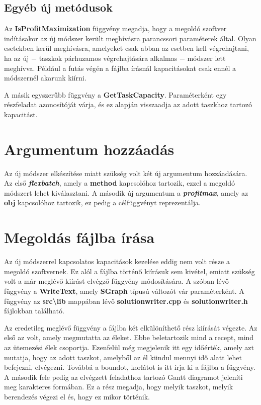 \subsection{Egyéb új metódusok}
Az \textbf{IsProfitMaximization} függvény megadja, hogy a megoldó szoftver indításakor az új módszer került meghívásra parancssori paraméterek által. Olyan esetekben kerül meghívásra, amelyeket csak abban az esetben kell végrehajtani, ha az új $-$ taszkok párhuzamos végrehajtására alkalmas $-$ módszer lett meghívva. Például a futás végén a fájlba írásnál kapacitásokat csak ennél a módszernél akarunk kiírni.

A másik egyszerűbb függvény a \textbf{GetTaskCapacity}. Paraméterként egy részfeladat azonosítóját várja, és ez alapján visszaadja az adott taszkhoz tartozó kapacitást.

\section{Argumentum hozzáadás}
Az új módszer elkészítése miatt szükség volt két új argumentum hozzáadására.
Az első \textbf{\textit{flexbatch}}, amely a \textbf{method} kapcsolóhoz tartozik, ezzel a megoldó módszert lehet kiválasztani.
A második új argumentum a \textbf{\textit{profit\textunderscore max}}, amely az \textbf{obj} kapcsolóhoz tartozik, ez pedig a célfüggvényt reprezentálja.

\section{Megoldás fájlba írása}
Az új módszerrel kapcsolatos kapacitások kezelése eddig nem volt része a megoldó szoftvernek.
Ez alól a fájlba történő kiírásuk sem kivétel, emiatt szükség volt a már meglévő kiírást elvégző függvény módosítására.
A szóban lévő függvény a \textbf{WriteText}, amely \textbf{SGraph} típusú változót vár paraméterként.
A függvény az \textbf{src\textbackslash lib} mappában lévő \textbf{solutionwriter.cpp} és \textbf{solutionwriter.h} fájlokban található.

Az eredetileg meglévő függvény a fájlba két elkülöníthető rész kiírását végezte. Az első az volt, amely megmutatta az éleket.
Ebbe beletartozik mind a recept, mind az ütemezési élek csoportja.
Ezenfelül még megjelenik itt egy időérték, amely azt mutatja, hogy az adott taszkot, amelyből az él kiindul mennyi idő alatt lehet befejezni, elvégezni. Továbbá a boundot, korlátot is itt írja ki a fájlba a függvény.
A második fele pedig az elvégzett feladathoz tartozó Gantt diagramot jeleníti meg karakteres formában.
Ez a rész megadja, hogy melyik taszkot, melyik berendezés végezi el és, hogy ez mikor történik.

